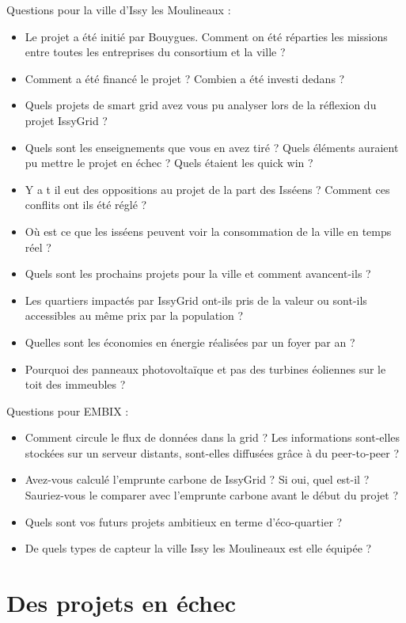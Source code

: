 Questions pour la ville d'Issy les Moulineaux :
\begin{itemize}
    \item Le projet a été initié par Bouygues. Comment on été réparties les missions entre toutes les entreprises du
consortium et la ville ?
    \item Comment a été financé le projet ? Combien a été investi dedans ?
    \item Quels projets de smart grid avez vous pu analyser lors de la réflexion du projet IssyGrid ?
    \item Quels sont les enseignements que vous en avez tiré ? Quels éléments auraient pu mettre le projet
en échec ? Quels étaient les quick win ?
    \item Y a t il eut des oppositions au projet de la part des Isséens ? Comment ces conflits ont ils été réglé ?
    \item Où est ce que les isséens peuvent voir la consommation de la ville en temps réel ?
    \item Quels sont les prochains projets pour la ville et comment avancent-ils ?
    \item Les quartiers impactés par IssyGrid ont-ils pris de la valeur ou sont-ils accessibles
au même prix par la population ?
    \item Quelles sont les économies en énergie réalisées par un foyer par an ?
    \item Pourquoi des panneaux photovoltaïque et pas des turbines éoliennes sur le toit des immeubles ?
\end{itemize}

Questions pour EMBIX :
\begin{itemize}
    \item Comment circule le flux de données dans la grid ? Les informations sont-elles stockées sur un serveur distants,
sont-elles diffusées grâce à du peer-to-peer ?
    \item Avez-vous calculé l'emprunte carbone de IssyGrid ? Si oui, quel est-il ? Sauriez-vous le comparer avec l'emprunte
carbone avant le début du projet ?
    \item Quels sont vos futurs projets ambitieux en terme d'éco-quartier ?
    \item De quels types de capteur la ville Issy les Moulineaux est elle équipée ?
\end{itemize}


\section{Des projets en échec}

